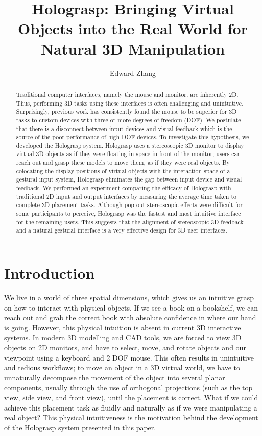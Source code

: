 \documentclass[pageno]{jpaper}
\begin{document}
\title{Holograsp: Bringing Virtual Objects into the Real World for Natural 3D Manipulation}

\date{}
\author{Edward Zhang}
\maketitle
\onehalfspace
\thispagestyle{empty}

\begin{abstract}
Traditional computer interfaces, namely the mouse and monitor, are inherently 2D. Thus, performing 3D tasks using
these interfaces is often challenging and unintuitive. Surprisingly,
previous work has consistently found the mouse to be superior for 3D tasks to custom devices with three or more degrees
of freedom (DOF). We postulate that there is a disconnect between input devices and visual feedback which is the
source of the poor performance of high DOF devices. To investigate this hypothesis, we developed the Holograsp
system. Holograsp uses a stereoscopic 3D monitor to display virtual 3D objects as if they were floating in
space in front of the monitor; users can reach out and grasp these models to move them, as if they were real
objects. By colocating the display positions of virtual objects with the interaction space of a gestural input system,
Holograsp eliminates the gap between input device and visual feedback.
We performed an experiment comparing the efficacy of Holograsp with traditional 2D input and output
interfaces by measuring the average time taken to complete 3D placement tasks. Although 
pop-out stereoscopic effects were difficult for some participants to perceive, Holograsp was the fastest
and most intuitive interface for the remaining users. This suggests that the alignment of stereoscopic 3D
feedback and a natural gestural interface is a very effective design for 3D user interfaces.
\end{abstract}

\newpage
\tableofcontents
\newpage

\section{Introduction}
We live in a world of three spatial dimensions, which gives us an intuitive grasp on how to interact with
physical objects. If we see a book on a bookshelf, we can reach out and grab the correct book with
absolute confidence in where our hand is going. However, this physical intuition is absent in current 3D interactive
systems. In modern 3D modelling and CAD tools, we are forced to view 3D objects on 2D monitors, and have to
select, move, and rotate objects and our viewpoint using a keyboard and 2 DOF mouse. This often results in unintuitive and
tedious workflows; to move an object in a 3D virtual world, we have to unnaturally decompose the movement of the
object into several planar components, usually through the use of orthogonal projections (such as the top view, side view, and front view),
until the placement is correct.
What if we could achieve this placement task as fluidly and naturally as if we were manipulating a real object? This
physical intuitiveness is the motivation behind the development of the Holograsp system presented in this paper.
\end{document}
